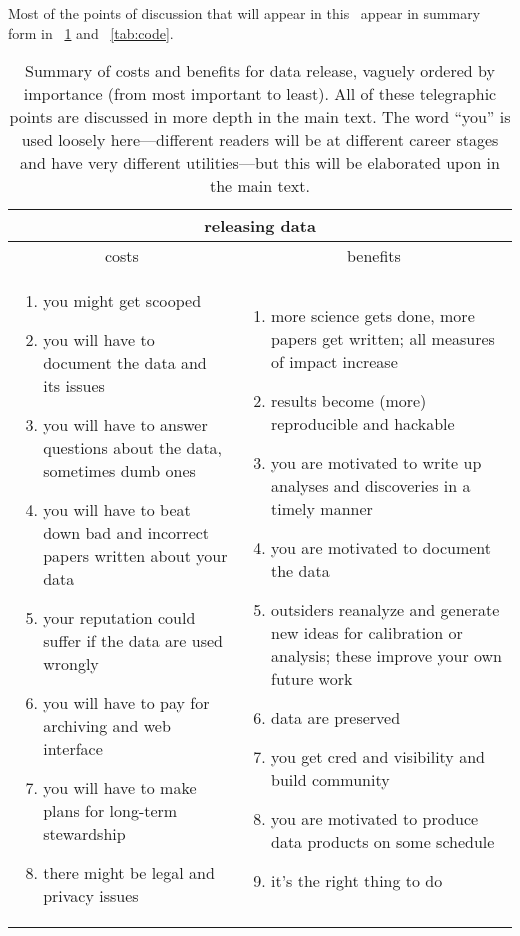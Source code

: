 \documentclass[12pt,twoside,pdftex]{article}
\begin{document}
Most of the points of discussion that will appear in this
\documentname\ appear in summary form in \tablename~\ref{tab:data} and
\tablename~\ref{tab:code}.%
\newlength{\cwidth}\setlength{\cwidth}{0.483\textwidth}%
\begin{table}%
\begin{tabular}{@{}p{\cwidth}|p{\cwidth}@{}}%
\multicolumn{2}{c}{\textbf{releasing data}} \\ \hline
\multicolumn{1}{c|}{costs} & \multicolumn{1}{c}{benefits} \\ \hline
\begin{enumerate}\raggedright
\item you might get scooped
\item you will have to document the data and its issues
\item you will have to answer questions about the data, sometimes dumb ones
\item you will have to beat down bad and incorrect papers written about your data
\item your reputation could suffer if the data are used wrongly
\item you will have to pay for archiving and web interface
\item you will have to make plans for long-term stewardship
\item there might be legal and privacy issues
\end{enumerate}&\begin{enumerate}\raggedright
\item more science gets done, more papers get written; all measures of impact increase
\item results become (more) reproducible and hackable
\item you are motivated to write up analyses and discoveries in a timely manner
\item you are motivated to document the data
\item outsiders reanalyze and generate new ideas for calibration or analysis; these improve your own future work
\item data are preserved
\item you get cred and visibility and build community
\item you are motivated to produce data products on some schedule
\item it's the right thing to do
\end{enumerate}\end{tabular}
\caption{Summary of costs and benefits for data release, vaguely
  ordered by importance (from most important to least). All of these
  telegraphic points are discussed in more depth in the main text. The
  word ``you'' is used loosely here---different readers will be at
  different career stages and have very different utilities---but this
  will be elaborated upon in the main text.\label{tab:data}}
\end{table}
\end{document}
